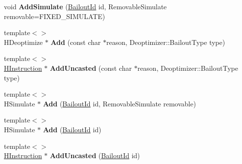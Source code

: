 \begin{DoxyCompactItemize}
\item 
\hypertarget{classv8_1_1internal_1_1_h_graph_builder_a3c9c8f998d8d79f6329e2d39756522bd}{}void {\bfseries Add\+Simulate} (\hyperlink{classv8_1_1internal_1_1_bailout_id}{Bailout\+Id} id, Removable\+Simulate removable=F\+I\+X\+E\+D\+\_\+\+S\+I\+M\+U\+L\+A\+T\+E)\label{classv8_1_1internal_1_1_h_graph_builder_a3c9c8f998d8d79f6329e2d39756522bd}

\item 
\hypertarget{classv8_1_1internal_1_1_h_graph_builder_a28f8bd88422ed5c2f60ea84ed5368995}{}{\footnotesize template$<$$>$ }\\H\+Deoptimize $\ast$ {\bfseries Add} (const char $\ast$reason, Deoptimizer\+::\+Bailout\+Type type)\label{classv8_1_1internal_1_1_h_graph_builder_a28f8bd88422ed5c2f60ea84ed5368995}

\item 
\hypertarget{classv8_1_1internal_1_1_h_graph_builder_a940a8e705f4f122e2ac22280f3e400d4}{}{\footnotesize template$<$$>$ }\\\hyperlink{classv8_1_1internal_1_1_h_instruction}{H\+Instruction} $\ast$ {\bfseries Add\+Uncasted} (const char $\ast$reason, Deoptimizer\+::\+Bailout\+Type type)\label{classv8_1_1internal_1_1_h_graph_builder_a940a8e705f4f122e2ac22280f3e400d4}

\item 
\hypertarget{classv8_1_1internal_1_1_h_graph_builder_a2f9a5a6886f61b1c58224a248af1bc75}{}{\footnotesize template$<$$>$ }\\H\+Simulate $\ast$ {\bfseries Add} (\hyperlink{classv8_1_1internal_1_1_bailout_id}{Bailout\+Id} id, Removable\+Simulate removable)\label{classv8_1_1internal_1_1_h_graph_builder_a2f9a5a6886f61b1c58224a248af1bc75}

\item 
\hypertarget{classv8_1_1internal_1_1_h_graph_builder_a5a6dca5268760c271b73c16a3fbd568b}{}{\footnotesize template$<$$>$ }\\H\+Simulate $\ast$ {\bfseries Add} (\hyperlink{classv8_1_1internal_1_1_bailout_id}{Bailout\+Id} id)\label{classv8_1_1internal_1_1_h_graph_builder_a5a6dca5268760c271b73c16a3fbd568b}

\item 
\hypertarget{classv8_1_1internal_1_1_h_graph_builder_a1c0eef80951bfeab68d62778423e13ab}{}{\footnotesize template$<$$>$ }\\\hyperlink{classv8_1_1internal_1_1_h_instruction}{H\+Instruction} $\ast$ {\bfseries Add\+Uncasted} (\hyperlink{classv8_1_1internal_1_1_bailout_id}{Bailout\+Id} id)\label{classv8_1_1internal_1_1_h_graph_builder_a1c0eef80951bfeab68d62778423e13ab}


\end{DoxyCompactItemize}
